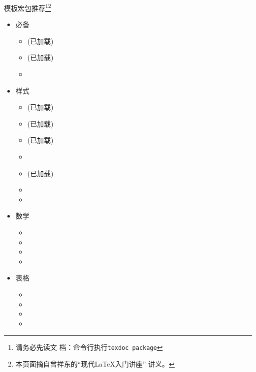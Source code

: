 \documentclass[fontset = none, xcolor=svgnames, t, aspectratio=169]{ctexbeamer}
\begin{document}
\begin{frame}{\nwafuprojrep 模板}{宏包推荐\footnote[frame,3]{请务必先读文
      档：命令行执行\alert{\texttt{texdoc package}}}\footnote[frame,4]{本页面摘自曾祥东的\enquote{现代\LaTeX 入门讲座}
      讲义。}}
  \stretchon
  \footnotesize
  \setlength{\leftmarginii}{1.5em}
  \vspace{-18ex}
  \begin{multicols}{3}
    \begin{itemize}
    \item 必备

      \begin{itemize}
      \item {}(已加载)
      \item {}(已加载)
      \item {}
      \end{itemize}

    \item 样式

      \begin{itemize}
      \item {}(已加载)
      \item {}(已加载)
      \item {}(已加载)
      \item {}
      \item {}(已加载)
      \item {}
      \item {}
      \end{itemize}

    \item 数学

      \begin{itemize}
      \item {}
      \item {}
      \item {}
      \item {}
      \end{itemize}

    \item 表格

      \begin{itemize}
      \item {}
      \item {}
      \item {}
      \item {}
      \end{itemize}


\end{itemize}
\end{multicols}
\end{frame}
\end{document}
